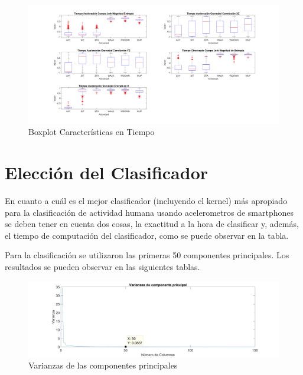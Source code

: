 \documentclass[11pt]{report}
\begin{document}
\begin{figure}[H]
  \centering
    \includegraphics[width=1\textwidth]{varianza_tiempo}
   \caption{Boxplot Características en Tiempo}
\end{figure}

\par
\medskip
\noindent


\section{Elección del Clasificador}

En cuanto a cuál es el mejor clasificador (incluyendo el kernel) más apropiado para la clasificación de actividad humana usando acelerometros de smartphones se deben tener en cuenta dos cosas, la exactitud a la hora de clasificar y, además, el tiempo de computación del clasificador, como se puede observar en la tabla.

Para la clasificación se utilizaron las primeras 50 componentes principales. Los resultados se pueden observar en las siguientes tablas.

\begin{figure}[H]
  \centering
    \includegraphics[width=1\textwidth]{pca}
   \caption{Varianzas de las componentes principales}
\end{figure}
\end{document}

